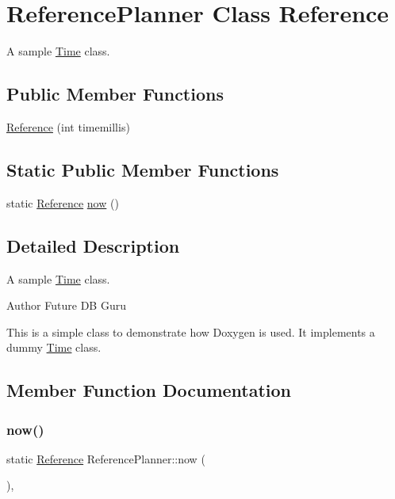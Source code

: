 \hypertarget{classReferencePlanner}{}\section{Reference\+Planner Class Reference}
\label{classReferencePlanner}


A sample \hyperlink{classTime}{Time} class.  


\subsection*{Public Member Functions}
\begin{DoxyCompactItemize}
\item 
\hyperlink{classReferencePlanner_a5e2a5e0074a7f5c58ee00bedfdf5fcb8}{Reference} (int timemillis)
\end{DoxyCompactItemize}
\subsection*{Static Public Member Functions}
\begin{DoxyCompactItemize}
\item 
static \hyperlink{classReferencePlanner_a5e2a5e0074a7f5c58ee00bedfdf5fcb8}{Reference} \hyperlink{classReferencePlanner_ac77980a6b9e0226dcf473e0bc0aecd2d}{now} ()
\end{DoxyCompactItemize}


\subsection{Detailed Description}
A sample \hyperlink{classTime}{Time} class. 

\begin{DoxyAuthor}{Author}
Future DB Guru
\end{DoxyAuthor}
This is a simple class to demonstrate how Doxygen is used. It implements a dummy \hyperlink{classTime}{Time} class. 

\subsection{Member Function Documentation}
\mbox{\label{classReferencePlanner_ac77980a6b9e0226dcf473e0bc0aecd2d}} 
\subsubsection{\texorpdfstring{now()}{now()}}
{\footnotesize\ttfamily static \hyperlink{classReferencePlanner_a5e2a5e0074a7f5c58ee00bedfdf5fcb8}{Reference} Reference\+Planner\+::now (\begin{DoxyParamCaption}{ }\end{DoxyParamCaption})\hspace{0.3cm}{\ttfamily [inline]}, {\ttfamily [static]}}

